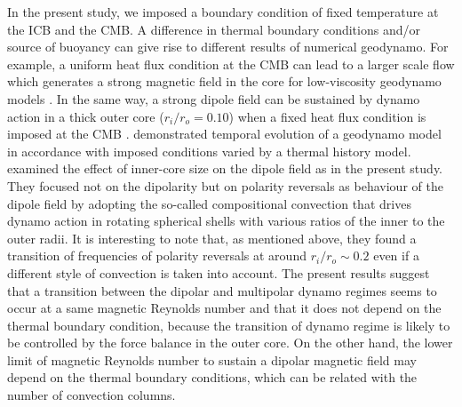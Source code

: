 In the present study, we imposed a boundary condition of fixed temperature at the ICB and the CMB.
A difference in thermal boundary conditions and/or source of buoyancy can give rise to different results of numerical geodynamo.
For example, a uniform heat flux condition at the CMB can lead to a larger scale flow which generates a strong magnetic field in the core for low-viscosity geodynamo models \citep{Ataru:2009}.
%
In the same way, a strong dipole field can be sustained by dynamo action in a thick outer core ($r_i / r_o = 0.10$) when a fixed heat flux condition is imposed at the CMB \citep{Hori:2010}.
\citet{Driscoll:2016} demonstrated temporal evolution of a geodynamo model in accordance with imposed conditions varied by a thermal history model.
\citet{Lhuillier:2019} examined the effect of inner-core size on the dipole field as in the present study.
They focused not on the dipolarity but on polarity reversals as behaviour of the dipole field by adopting the so-called compositional convection that drives dynamo action in rotating spherical shells with various ratios of the inner to the outer radii.
It is interesting to note that, as mentioned above, they found a transition of frequencies of polarity reversals at around $r_i / r_o \sim 0.2$ even if a different style of convection is taken into account.
%
The present results suggest that a transition between the dipolar and multipolar dynamo regimes seems to occur at a same magnetic Reynolds number and that it does not depend on the thermal boundary condition, because the transition of dynamo regime is likely to be controlled by the force balance in the outer core.
%
On the other hand, the lower limit of magnetic Reynolds number to sustain a dipolar magnetic field may depend on the thermal boundary conditions, which can be related with the number of convection columns.

